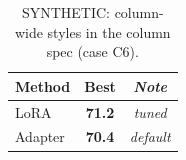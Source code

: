 \begin{table}[t]
\centering
\caption{SYNTHETIC: column-wide styles in the column spec (case C6).}
\label{tab:synthetic-c6}
\begin{tabular}{l>{\bfseries}c>{\itshape}c}
\toprule
Method & Best & Note \\
\midrule
LoRA & 71.2 & tuned \\
Adapter & 70.4 & default \\
\bottomrule
\end{tabular}
\end{table}
